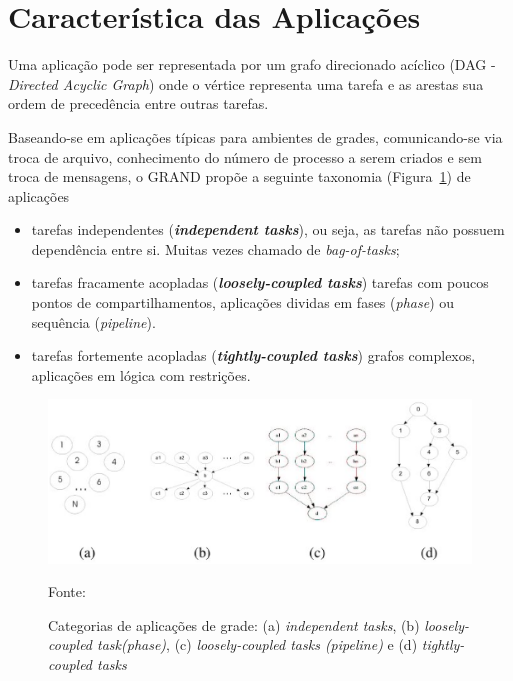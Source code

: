 \section{Característica das Aplicações}

Uma aplicação pode ser representada por um grafo direcionado acíclico (DAG - \emph{Directed Acyclic Graph}) onde o vértice representa uma tarefa e as arestas sua ordem de precedência entre outras tarefas.

Baseando-se em aplicações típicas para ambientes de grades, comunicando-se via troca de arquivo, conhecimento do número de processo a serem criados e sem troca de mensagens, o GRAND propõe a seguinte taxonomia (Figura~\ref{fig:Taxonomia_Aplicacoes}) de aplicações \cite{Vargas2003, Vargas2005, Mangan2006}

\begin{itemize}
	\item tarefas independentes (\emph{\textbf{independent tasks}}), ou seja, as tarefas não possuem dependência entre si. Muitas vezes chamado de \emph{bag-of-tasks};
	\item tarefas fracamente acopladas (\emph{\textbf{loosely-coupled tasks}}) tarefas com poucos pontos de compartilhamentos, aplicações dividas em fases (\emph{phase}) ou sequência (\emph{pipeline}).
	\item tarefas fortemente acopladas (\emph{\textbf{tightly-coupled tasks}}) grafos complexos, aplicações em lógica com restrições.
\end{itemize}

\begin{figure}[htb]
\begin{center}
\includegraphics[scale=0.7]{./img/taxonomia.eps}
\caption{Categorias de aplicações de grade: (a) \emph{independent tasks}, (b) \emph{loosely-coupled task(phase)}, (c) \emph{loosely-coupled tasks (pipeline)} e (d) \emph{tightly-coupled tasks}}
\label{fig:Taxonomia_Aplicacoes}
Fonte: \cite{Mangan2006}
\end{center}
\end{figure}

